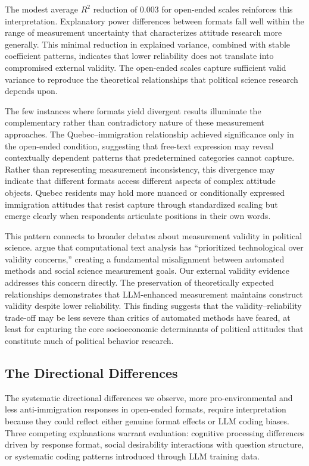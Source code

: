 \documentclass[
  journal=ram,
  manuscript=article-type,
  year=2025,
  volume=unpublished,
]{cup-journal}
\begin{document}
The modest average $R^{2}$ reduction of 0.003 for open-ended scales reinforces this interpretation.
Explanatory power differences between formats fall well within the range of measurement uncertainty that characterizes attitude research more generally.
This minimal reduction in explained variance, combined with stable coefficient patterns, indicates that lower reliability does not translate into compromised external validity.
The open-ended scales capture sufficient valid variance to reproduce the theoretical relationships that political science research depends upon.

The few instances where formats yield divergent results illuminate the complementary rather than contradictory nature of these measurement approaches.
The Quebec–immigration relationship achieved significance only in the open-ended condition, suggesting that free-text expression may reveal contextually dependent patterns that predetermined categories cannot capture.
Rather than representing measurement inconsistency, this divergence may indicate that different formats access different aspects of complex attitude objects.
Quebec residents may hold more nuanced or conditionally expressed immigration attitudes that resist capture through standardized scaling but emerge clearly when respondents articulate positions in their own words.

This pattern connects to broader debates about measurement validity in political science.
\citet{baden_etal22} argue that computational text analysis has “prioritized technological over validity concerns,” creating a fundamental misalignment between automated methods and social science measurement goals.
Our external validity evidence addresses this concern directly.
The preservation of theoretically expected relationships demonstrates that LLM-enhanced measurement maintains construct validity despite lower reliability.
This finding suggests that the validity–reliability trade-off may be less severe than critics of automated methods have feared, at least for capturing the core socioeconomic determinants of political attitudes that constitute much of political behavior research.

\subsection{The Directional Differences}

The systematic directional differences we observe, more pro-environmental and less anti-immigration responses in open-ended formats, require interpretation because they could reflect either genuine format effects or LLM coding biases.
Three competing explanations warrant evaluation: cognitive processing differences driven by response format, social desirability interactions with question structure, or systematic coding patterns introduced through LLM training data.
\end{document}
